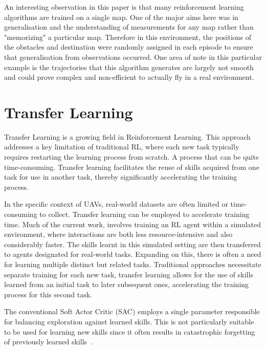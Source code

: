 An interesting observation in this paper is that many reinforcement learning algorithms are trained on a single map.
One of the major aims here was in generalisation and the understanding of measurements for any map rather than "memorizing" a particular map.
Therefore in this environment, the positions of the obstacles and destination were randomly assigned in each episode to ensure that generalisation from observations occurred.
One area of note in this particular example is the trajectories that this algorithm generates are largely not smooth and could prove complex and non-efficient to actually fly in a real environment.



\section{Transfer Learning}
Transfer Learning is a growing field in Reinforcement Learning.
This approach addresses a key limitation of traditional RL, where each new task typically requires restarting the learning process from scratch.
A process that can be quite time-consuming. 
Transfer learning facilitates the reuse of skills acquired from one task for use in another task, thereby significantly accelerating the training process.

In the specific context of UAVs, real-world datasets are often limited or time-consuming to collect.
Transfer learning can be employed to accelerate training time.
Much of the current work, involves training an RL agent within a simulated environment, where interactions are both less resource-intensive and also considerably faster. 
The skills learnt in this simulated setting are then transferred to agents designated for real-world tasks.
Expanding on this, there is often a need for learning multiple distinct but related tasks.
Traditional approaches necessitate separate training for each new task, transfer learning allows for the use of skills learned from an initial task to later subsequent ones, accelerating the training process for this second task.

The conventional Soft Actor Critic (SAC) employs a single parameter responsible for balancing exploration against learned skills.
This is not particularly suitable to be used for learning new skills since it often results in catastrophic forgetting of previously learned skills~\cite{fyp10-initial-transfer-learning}.

